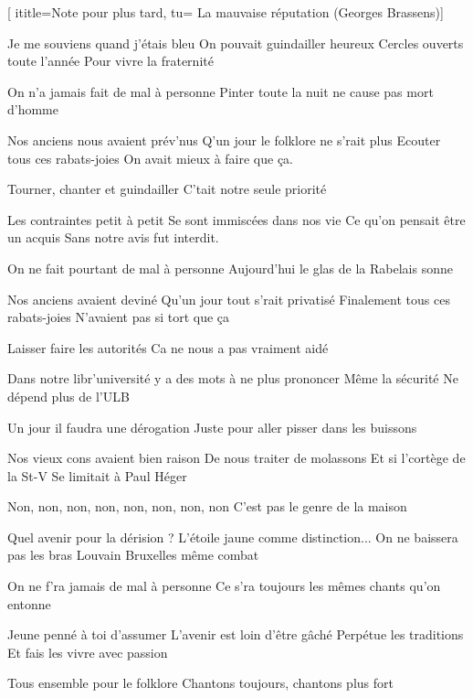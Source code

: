  [
ititle={Note pour plus tard},
tu= {La mauvaise réputation (Georges Brassens)}]


\beginverse
Je me souviens quand j'étais bleu
On pouvait guindailler heureux
Cercles ouverts toute l'année
Pour vivre la fraternité
\endverse

\beginchorus
On n'a jamais fait de mal à personne
Pinter toute la nuit ne cause pas mort d'homme


Nos anciens nous avaient prév'nus
Q'un jour le folklore ne s'rait plus
Ecouter tous ces rabats-joies
On avait mieux à faire que ça.
\endverse

\beginchorus
Tourner, chanter et guindailler
C'tait notre seule priorité
\endchorus

\beginverse
Les contraintes petit à petit
Se sont immiscées dans nos vie
Ce qu'on pensait être un acquis
Sans notre avis fut interdit.
\endverse

\beginchorus
On ne fait pourtant de mal à personne
Aujourd'hui le glas de la Rabelais sonne
\endchorus

\beginverse
Nos anciens avaient deviné
Qu'un jour tout s'rait privatisé
Finalement tous ces rabats-joies
N'avaient pas si tort que ça
\endverse

\beginchorus
Laisser faire les autorités
Ca ne nous a pas vraiment aidé
\endchorus

\beginverse
Dans notre libr'université
y a des mots à ne plus prononcer
Même la sécurité
Ne dépend plus de l'ULB
\endverse

\beginchorus
Un jour il faudra une dérogation
Juste pour aller pisser dans les buissons
\endchorus

\beginverse
Nos vieux cons avaient bien raison
De nous traiter de molassons
Et si l'cortège de la St-V
Se limitait à Paul Héger
\endverse

\beginchorus
Non, non, non, non, non, non, non, non
C'est pas le genre de la maison
\endchorus

\beginverse
Quel avenir pour la dérision ?
L'étoile jaune comme distinction...
On ne baissera pas les bras
Louvain Bruxelles même combat
\endverse

\beginchorus
On ne f'ra jamais de mal à personne
Ce s'ra toujours les mêmes chants qu'on entonne
\endchorus

\beginverse
Jeune penné à toi d'assumer
L'avenir est loin d'être gâché
Perpétue les traditions
Et fais les vivre avec passion
\endverse

\beginchorus
Tous ensemble pour le folklore
Chantons toujours, chantons plus fort
\endchorus

\endsong